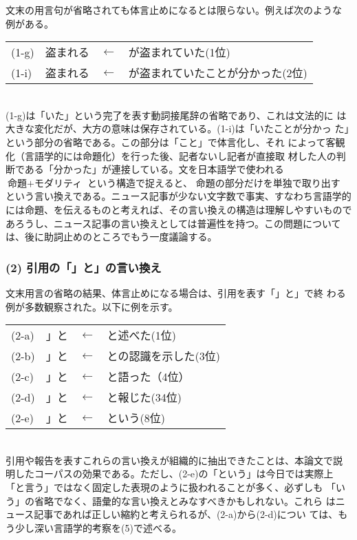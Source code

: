 \documentclass[jnlpbbl]{jnlp_j}
\begin{document}
文末の用言句が省略されても体言止めになるとは限らない。例えば次のような
例がある。
\\

\begin{tabular}{llcl}
(1-g) & 盗まれる  & $\leftarrow$ &  が盗まれていた(1位) \\
(1-i) & 盗まれる  & $\leftarrow$ &  が盗まれていたことが分かった(2位) 
\end{tabular}
\\

(1-g)は「いた」という完了を表す動詞接尾辞の省略であり、これは文法的に
は大きな変化だが、大方の意味は保存されている。(1-i)は「いたことが分かっ
た」という部分の省略である。この部分は「こと」で体言化し、それ
によって客観化（言語学的には命題化）を行った後、記者ないし記者が直接取
材した人の判断である「分かった」が連接している。文を日本語学で使われる
$\mbox{命題} + \mbox{モダリティ}$ という構造で捉えると、
命題の部分だけを単独で取り出す
という言い換えである。ニュース記事が少ない文字数で事実、すなわち言語学的
には命題、を伝えるものと考えれば、その言い換えの構造は理解しやすいもので
あろうし、ニュース記事の言い換えとしては普遍性を持つ。この問題について
は、後に助詞止めのところでもう一度議論する。

\subsubsection*{(2) 引用の「」と」の言い換え}

文末用言の省略の結果、体言止めになる場合は、引用を表す「」と」で終
わる例が多数観察された。以下に例を示す。
\\

\begin{tabular}{llcl}
(2-a) & 」と  & $\leftarrow$ &  と述べた(1位) \\
(2-b) & 」と  & $\leftarrow$ &  との認識を示した(3位) \\
(2-c) & 」と  & $\leftarrow$ &  と語った（4位）\\
(2-d) & 」と  & $\leftarrow$ &  と報じた(34位) \\
(2-e) & 」と  & $\leftarrow$ &  という(8位)
\end{tabular}
\\

引用や報告を表すこれらの言い換えが組織的に抽出できたことは、本論文で説
明したコーパスの効果である。ただし、(2-e)の「という」は今日では実際上
「と言う」ではなく固定した表現のように扱われることが多く、必ずしも
「いう」の省略でなく、語彙的な言い換えとみなすべきかもしれない。これら
はニュース記事であれば正しい縮約と考えられるが、(2-a)から(2-d)につい
ては、もう少し深い言語学的考察を(5)で述べる。
\end{document}
